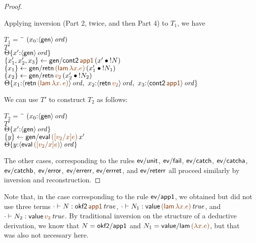 \begin{proof}
\begin{description}
\medskip
Applying inversion (Part 2, twice, and then Part 4) to $T_1$, we have

\begin{tabbing}
$T_1 = ~$ \= \qquad \= $(x_0{:}{\langle {\sf gen} \rangle}\,{{\it ord}})$
\\
\>$T'$
\\
\>\>${\Theta}\{{x'{:}{\langle {\sf gen} \rangle}\,{{\it ord}}}\}$
\\
\>$\trstep{x_1', x_2', x_3}
     {{\sf gen/cont2}\,\lf{\sf app1}\,(\tfuser{x'}{\tbangr{N}})}$
\\
\>$\trstep{x_1}
     {{\sf gen/retn}\,\lf{({\sf lam}\,\lambda x.e)}\,
        (\tfuser{x_1'}{\tbangr{N_1}})}$ 
\\
\>$\trstep{x_2}
     {{\sf gen/retn}\,\lf{v_2}\,(\tfuser{x_2'}{\tbangr{N_2}})}$
\\
\>\>$\tackon{\Theta}{x_1{:}\istrue{\susp{{\sf retn}\,\lf{({\sf lam}\,\lambda x.\,e)}}}, ~
                   x_2{:}\istrue{\susp{{\sf retn}\,\lf{v_2}}}, ~
                   x_3{:}\istrue{\susp{{\sf cont2}\,\lf{\sf app1}}}}$
\end{tabbing}

We can use $T'$ to construct $T_2$ as follows:
\begin{tabbing}
$T_2 = ~$ \= \qquad \= $(x_0{:}{\langle {\sf gen} \rangle}\,{{\it ord}})$
\\
\>$T'$
\\
\>\>${\Theta}\{{x'{:}{\langle {\sf gen} \rangle}\,{{\it ord}}}\}$
\\
\>$\trstep{y}
     {{\sf gen/eval}\,\lf{([v_2/x]e)}\,x'}$
\\
\>\>$\tackon{\Theta}{y{:}\istrue{\susp{{\sf eval}\,\lf{([v_2/x]e)}}}}$
\end{tabbing}


\end{description}

\noindent
The other cases, corresponding to the rules ${\sf ev/unit}$, ${\sf
  ev/fail}$, ${\sf ev/catch}$, ${\sf ev/catcha}$, ${\sf ev/catchb}$,
${\sf ev/error}$, ${\sf ev/errerr}$, ${\sf ev/errret}$, and ${\sf
  ev/reterr}$ all proceed similarly by inversion and
reconstruction. 
\end{proof}

Note that, in the case corresponding to the rule ${\sf ev/app1}$, we
obtained but did not use three terms $\cdot \vdash N : \isconc{{{\sf
    okf2}\,\lf{\sf app1}}}$, $\cdot \vdash N_1 : \isconc{{\sf value}\,\lf{({\sf
    lam}\,\lambda x.e)}}$, and $\cdot \vdash N_2 : \isconc{{{\sf
    value}\,\lf{v_2}}}$. 
By traditional inversion on the structure of a
deductive derivation, we know that $N = {\sf okf2/app1}$ and $N_1 =
{\sf value/lam}\,\lf{(\lambda x.e)}$, but that was also not necessary here.


